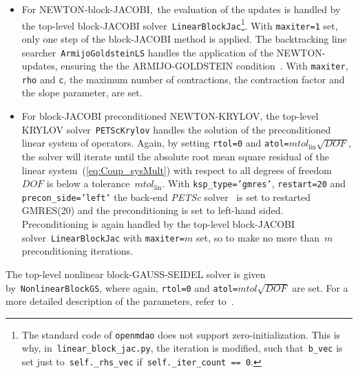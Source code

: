 \documentclass[10pt, ngerman, english,
twoside, open=right,
numbers=noenddot,
declaration=section,
abstract=section,
abstract=multiple,
abstract=notoc,
declaration=notoc,
cd=pale, 
chapterprefix=off, 
chapterpage=false, 
headingsvskip=-10em,
cdgeometry=custom, 
slantedgreek=on,
cdmath=on, 
cdfont=on,
ttfont=false,
mathswap=off,
]{tudscrreprt}
\numberwithin{equation}{chapter}
\renewcommand{\textsc}[1]{\uppercase{\mbox{#1}}}
\begin{document}
\begin{itemize}
\item For \textsc{Newton}-block-\textsc{Jacobi},~the evaluation of the updates is handled by the top-level block-\textsc{Jacobi} solver~\texttt{LinearBlockJac}\footnote{The standard code of \texttt{openmdao} does not support zero-initialization. This is why, in~\texttt{linear\_block\_jac.py}, the iteration is modified, such that~\texttt{b\_vec} is set just to~\texttt{self.\_rhs\_vec} if~\texttt{self.\_iter\_count == 0}.}. With \texttt{maxiter=1} set, only one step of the block-\textsc{Jacobi} method is applied.
The backtracking line searcher~\texttt{ArmijoGoldsteinLS} handles the application of the \textsc{Newton}-updates, ensuring the the \textsc{Armijo}-\textsc{Goldstein} condition~\cite{Armijo}. With \texttt{maxiter}, \texttt{rho} and \texttt{c}, the maximum number of contractions, the contraction factor and the slope parameter, are set.
\item For block-\textsc{Jacobi} preconditioned \textsc{Newton}-\textsc{Krylov}, the top-level \textsc{Krylov} solver~\texttt{PETScKrylov} handles the solution of the preconditioned linear system of operators. Again, by setting \texttt{rtol=0} and \texttt{atol=$mtol_\mathrm{lin}\sqrt{DOF}$}, the solver will iterate until the absolute root mean square residual of the linear system~(\ref{eq:Coup_sysMult}) with respect to all degrees of freedom~$DOF$ is below a tolerance~$mtol_\mathrm{lin}$. With \texttt{ksp\_type='gmres'}, \texttt{restart=20} and \texttt{precon\_side='left'} the back-end \textit{PETSc} solver~\cite{PETScDoc, petsc4py} is set to restarted GMRES(20) and the preconditioning is set to left-hand sided. Preconditioning is again handled by the top-level block-\textsc{Jacobi} solver~\texttt{LinearBlockJac} with \texttt{maxiter=$m$} set, so to make no more than~$m$ preconditioning iterations.
\end{itemize}
The top-level nonlinear block-\textsc{Gau\ss}-\textsc{Seidel} solver is given by~\texttt{NonlinearBlockGS}, where again, \texttt{rtol=0} and \texttt{atol=$mtol\sqrt{DOF}$} are set.
For a more detailed description of the parameters, refer to~\cite{OpenMDAODoc}.\par
\end{document}

